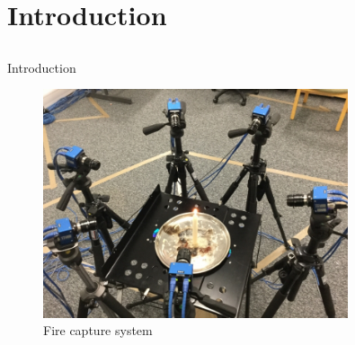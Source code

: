 \documentclass{beamer}
\begin{document}
\section{Introduction}
\subsection{ }

\begin{frame}{Introduction}

\begin{figure}[b!]
\includegraphics[width=0.8\textwidth]{img/system1}
\caption*{\tiny{Fire capture system}}
\end{figure}

\end{frame}
\end{document}
